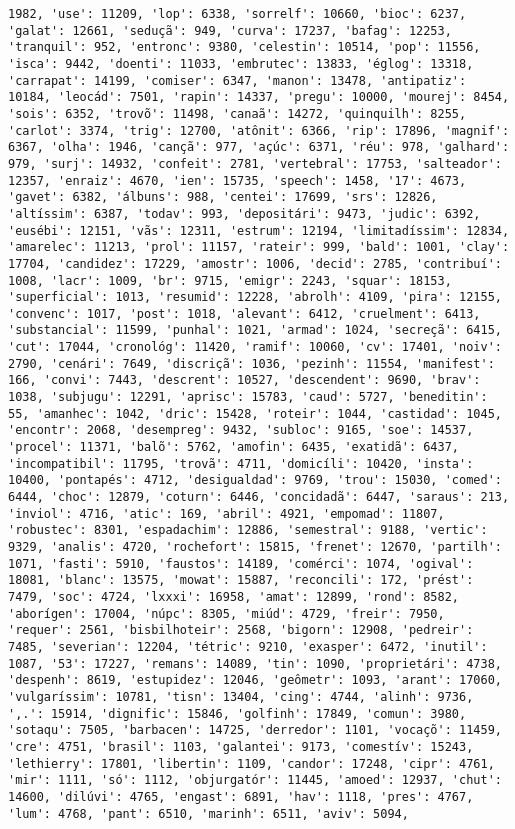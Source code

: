 \documentclass[11pt]{article}
\begin{document}
\begin{Verbatim}[commandchars=\\\{\}]
1982, 'use': 11209, 'lop': 6338, 'sorrelf': 10660, 'bioc': 6237, 'galat': 12661, 'seduçã': 949, 'curva': 17237, 'bafag': 12253, 'tranquil': 952, 'entronc': 9380, 'celestin': 10514, 'pop': 11556, 'isca': 9442, 'doenti': 11033, 'embrutec': 13833, 'églog': 13318, 'carrapat': 14199, 'comiser': 6347, 'manon': 13478, 'antipatiz': 10184, 'leocád': 7501, 'rapin': 14337, 'pregu': 10000, 'mourej': 8454, 'sois': 6352, 'trovõ': 11498, 'canaã': 14272, 'quinquilh': 8255, 'carlot': 3374, 'trig': 12700, 'atônit': 6366, 'rip': 17896, 'magnif': 6367, 'olha': 1946, 'cançã': 977, 'açúc': 6371, 'réu': 978, 'galhard': 979, 'surj': 14932, 'confeit': 2781, 'vertebral': 17753, 'salteador': 12357, 'enraiz': 4670, 'ien': 15735, 'speech': 1458, '17': 4673, 'gavet': 6382, 'álbuns': 988, 'centei': 17699, 'srs': 12826, 'altíssim': 6387, 'todav': 993, 'depositári': 9473, 'judic': 6392, 'eusébi': 12151, 'vãs': 12311, 'estrum': 12194, 'limitadíssim': 12834, 'amarelec': 11213, 'prol': 11157, 'rateir': 999, 'bald': 1001, 'clay': 17704, 'candidez': 17229, 'amostr': 1006, 'decid': 2785, 'contribuí': 1008, 'lacr': 1009, 'br': 9715, 'emigr': 2243, 'squar': 18153, 'superficial': 1013, 'resumid': 12228, 'abrolh': 4109, 'pira': 12155, 'convenc': 1017, 'post': 1018, 'alevant': 6412, 'cruelment': 6413, 'substancial': 11599, 'punhal': 1021, 'armad': 1024, 'secreçã': 6415, 'cut': 17044, 'cronológ': 11420, 'ramif': 10060, 'cv': 17401, 'noiv': 2790, 'cenári': 7649, 'discriçã': 1036, 'pezinh': 11554, 'manifest': 166, 'convi': 7443, 'descrent': 10527, 'descendent': 9690, 'brav': 1038, 'subjugu': 12291, 'aprisc': 15783, 'caud': 5727, 'beneditin': 55, 'amanhec': 1042, 'dric': 15428, 'roteir': 1044, 'castidad': 1045, 'encontr': 2068, 'desempreg': 9432, 'subloc': 9165, 'soe': 14537, 'procel': 11371, 'balõ': 5762, 'amofin': 6435, 'exatidã': 6437, 'incompatibil': 11795, 'trovã': 4711, 'domicíli': 10420, 'insta': 10400, 'pontapés': 4712, 'desigualdad': 9769, 'trou': 15030, 'comed': 6444, 'choc': 12879, 'coturn': 6446, 'concidadã': 6447, 'saraus': 213, 'inviol': 4716, 'atic': 169, 'abril': 4921, 'empomad': 11807, 'robustec': 8301, 'espadachim': 12886, 'semestral': 9188, 'vertic': 9329, 'analis': 4720, 'rochefort': 15815, 'frenet': 12670, 'partilh': 1071, 'fasti': 5910, 'faustos': 14189, 'comérci': 1074, 'ogival': 18081, 'blanc': 13575, 'mowat': 15887, 'reconcili': 172, 'prést': 7479, 'soc': 4724, 'lxxxi': 16958, 'amat': 12899, 'rond': 8582, 'aborígen': 17004, 'núpc': 8305, 'miúd': 4729, 'freir': 7950, 'requer': 2561, 'bisbilhoteir': 2568, 'bigorn': 12908, 'pedreir': 7485, 'severian': 12204, 'tétric': 9210, 'exasper': 6472, 'inutil': 1087, '53': 17227, 'remans': 14089, 'tin': 1090, 'proprietári': 4738, 'despenh': 8619, 'estupidez': 12046, 'geômetr': 1093, 'arant': 17060, 'vulgaríssim': 10781, 'tisn': 13404, 'cing': 4744, 'alinh': 9736, ',.': 15914, 'dignific': 15846, 'golfinh': 17849, 'comun': 3980, 'sotaqu': 7505, 'barbacen': 14725, 'derredor': 1101, 'vocaçõ': 11459, 'cre': 4751, 'brasil': 1103, 'galantei': 9173, 'comestív': 15243, 'lethierry': 17801, 'libertin': 1109, 'candor': 17248, 'cipr': 4761, 'mir': 1111, 'só': 1112, 'objurgatór': 11445, 'amoed': 12937, 'chut': 14600, 'dilúvi': 4765, 'engast': 6891, 'hav': 1118, 'pres': 4767, 'lum': 4768, 'pant': 6510, 'marinh': 6511, 'aviv': 5094, 
\end{Verbatim}
\end{document}

